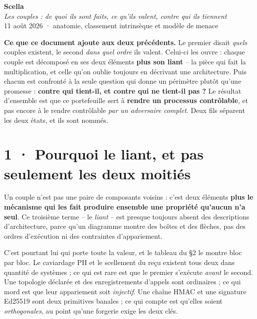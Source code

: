 \documentclass[10pt]{article}
\begin{document}
\begin{center}
{\Huge\bfseries\color{navy} Scella}\\[4pt]
{\large\color{grey}\itshape Les couples : de quoi ils sont faits, ce qu'ils valent, contre qui ils tiennent}\\[4pt]
{\small\color{grey} 11 août 2026 \; · \; anatomie, classement intrinsèque et modèle de menace}
\end{center}
\vspace{2pt}

\begin{these}
\textbf{Ce que ce document ajoute aux deux précédents.} Le premier disait \emph{quels} couples existent,
le second \emph{dans quel ordre} ils valent. Celui-ci les ouvre : chaque couple est décomposé en ses
deux éléments \textbf{plus son liant} -- la pièce qui fait la multiplication, et celle qu'on oublie
toujours en décrivant une architecture. Puis chacun est confronté à la seule question qui donne un
périmètre plutôt qu'une promesse : \textbf{contre qui tient-il, et contre qui ne tient-il pas ?} Le
résultat d'ensemble est que ce portefeuille sert à \textbf{rendre un processus contrôlable}, et pas
encore à le rendre contrôlable \emph{par un adversaire complet}. Deux fils séparent les deux états,
et ils sont nommés.
\end{these}

\section{1 · Pourquoi le liant, et pas seulement les deux moitiés}

Un couple n'est pas une paire de composants voisins : c'est deux éléments \textbf{plus le mécanisme
qui les fait produire ensemble une propriété qu'aucun n'a seul}. Ce troisième terme -- le
\emph{liant} -- est presque toujours absent des descriptions d'architecture, parce qu'un diagramme
montre des boîtes et des flèches, pas des ordres d'exécution ni des contraintes d'appariement.

C'est pourtant lui qui porte toute la valeur, et le tableau du §2 le montre bloc par bloc. Le
caviardage PII et le scellement du reçu existent tous deux dans quantité de systèmes ; ce qui est rare
est que le premier s'exécute \emph{avant} le second. Une topologie déclarée et des enregistrements
d'appels sont ordinaires ; ce qui mord est que leur appariement soit \emph{injectif}. Une chaîne HMAC
et une signature Ed25519 sont deux primitives banales ; ce qui compte est qu'elles soient
\emph{orthogonales}, au point qu'une forgerie exige les deux clés.
\end{document}

